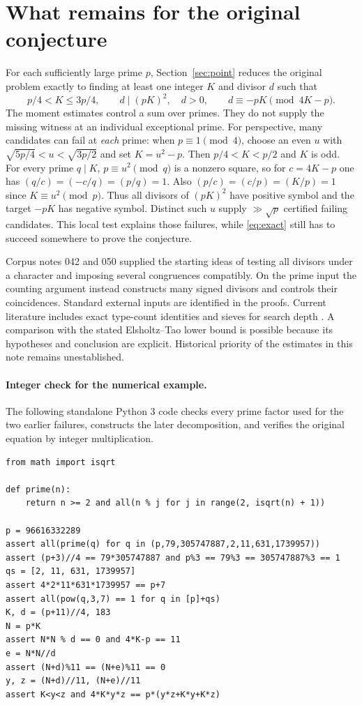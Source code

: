 \documentclass[a4paper,11pt]{article}
\begin{document}
\section{What remains for the original conjecture}
For each sufficiently large prime $p$, Section~\ref{sec:point} reduces the original problem exactly to finding at least one integer $K$ and divisor $d$ such that
\[
 p/4<K\le3p/4,\qquad d\mid(pK)^2,\quad d>0,\qquad
 d\equiv-pK\pmod{4K-p}.
\]
The moment estimates control a sum over primes. They do not supply the missing witness at an individual exceptional prime. For perspective, many candidates can fail at \emph{each} prime: when $p\equiv1\pmod4$, choose an even $u$ with $\sqrt{5p/4}<u<\sqrt{3p/2}$ and set $K=u^2-p$. Then $p/4<K<p/2$ and $K$ is odd. For every prime $q\mid K$, $p\equiv u^2\pmod q$ is a nonzero square, so for $c=4K-p$ one has $(q/c)=(-c/q)=(p/q)=1$. Also $(p/c)=(c/p)=(K/p)=1$ since $K\equiv u^2\pmod p$. Thus all divisors of $(pK)^2$ have positive symbol and the target $-pK$ has negative symbol. Distinct such $u$ supply $\gg\sqrt p$ certified failing candidates. This local test explains those failures, while \eqref{eq:exact} still has to succeed somewhere to prove the conjecture.

Corpus notes 042 and 050 \cite{vmrc} supplied the starting ideas of testing all divisors under a character and imposing several congruences compatibly. On the prime input the counting argument instead constructs many signed divisors and controls their coincidences. Standard external inputs are identified in the proofs. Current literature includes exact type-count identities \cite{jiang} and sieves for search depth \cite{dahan}. A comparison with the stated Elsholtz--Tao lower bound is possible because its hypotheses and conclusion are explicit. Historical priority of the estimates in this note remains unestablished.

\paragraph{Integer check for the numerical example.}
The following standalone Python 3 code checks every prime factor used for the two earlier failures, constructs the later decomposition, and verifies the original equation by integer multiplication.
\begin{Verbatim}[fontsize=\small]
from math import isqrt

def prime(n):
    return n >= 2 and all(n % j for j in range(2, isqrt(n) + 1))

p = 96616332289
assert all(prime(q) for q in (p,79,305747887,2,11,631,1739957))
assert (p+3)//4 == 79*305747887 and p%3 == 79%3 == 305747887%3 == 1
qs = [2, 11, 631, 1739957]
assert 4*2*11*631*1739957 == p+7
assert all(pow(q,3,7) == 1 for q in [p]+qs)
K, d = (p+11)//4, 183
N = p*K
assert N*N % d == 0 and 4*K-p == 11
e = N*N//d
assert (N+d)%11 == (N+e)%11 == 0
y, z = (N+d)//11, (N+e)//11
assert K<y<z and 4*K*y*z == p*(y*z+K*y+K*z)
\end{Verbatim}
\end{document}
